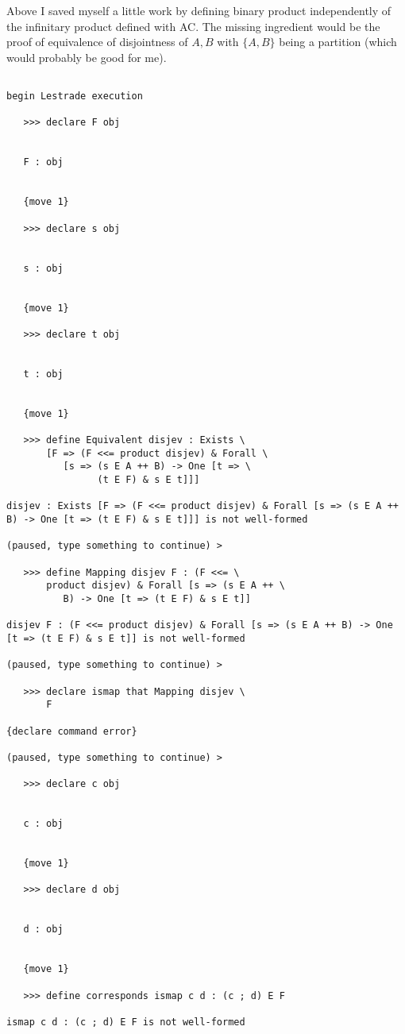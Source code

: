 \documentclass[12pt]{article}
\begin{document}
Above I saved myself a little work by defining binary product independently of the infinitary product defined with AC.  The missing ingredient would be the proof of equivalence
of disjointness of $A,B$ with $\{A,B\}$ being a partition (which would probably be good for me).

\begin{verbatim}

begin Lestrade execution

   >>> declare F obj


   F : obj


   {move 1}

   >>> declare s obj


   s : obj


   {move 1}

   >>> declare t obj


   t : obj


   {move 1}

   >>> define Equivalent disjev : Exists \
       [F => (F <<= product disjev) & Forall \
          [s => (s E A ++ B) -> One [t => \
                (t E F) & s E t]]]

disjev : Exists [F => (F <<= product disjev) & Forall [s => (s E A ++ B) -> One [t => (t E F) & s E t]]] is not well-formed

(paused, type something to continue) >

   >>> define Mapping disjev F : (F <<= \
       product disjev) & Forall [s => (s E A ++ \
          B) -> One [t => (t E F) & s E t]]

disjev F : (F <<= product disjev) & Forall [s => (s E A ++ B) -> One [t => (t E F) & s E t]] is not well-formed

(paused, type something to continue) >

   >>> declare ismap that Mapping disjev \
       F

{declare command error}

(paused, type something to continue) >

   >>> declare c obj


   c : obj


   {move 1}

   >>> declare d obj


   d : obj


   {move 1}

   >>> define corresponds ismap c d : (c ; d) E F

ismap c d : (c ; d) E F is not well-formed


\end{verbatim}
\end{document}
